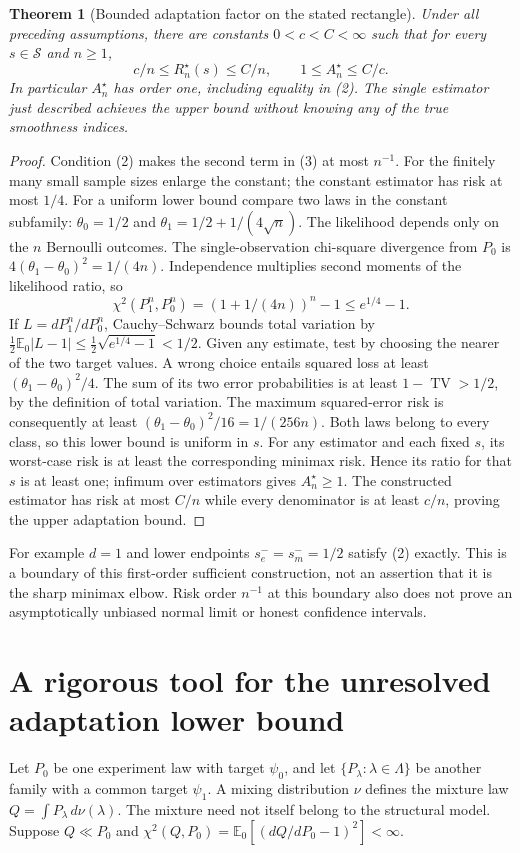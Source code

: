 \documentclass[11pt]{article}
\newtheorem{theorem}{Theorem}
\theoremstyle{remark}
\newcommand{\E}{\mathbb E}
\newcommand{\TV}{\operatorname{TV}}
\begin{document}
\begin{theorem}[Bounded adaptation factor on the stated rectangle]
Under all preceding assumptions, there are constants $0<c<C<\infty$
such that for every $s\in\mathcal S$ and $n\geq1$,
\[
 c/n\leq R_n^\star(s)\leq C/n,
 \qquad 1\leq A_n^\star\leq C/c.
\]
In particular $A_n^\star$ has order one, including equality in (2).
The single estimator just described achieves the upper bound without
knowing any of the true smoothness indices.
\end{theorem}
\begin{proof}
Condition (2) makes the second term in (3) at most $n^{-1}$.
For the finitely many small sample sizes enlarge the constant; the
constant estimator has risk at most $1/4$.
For a uniform lower bound compare two laws in the constant subfamily:
$\theta_0=1/2$ and $\theta_1=1/2+1/(4\sqrt n)$. The likelihood depends
only on the $n$ Bernoulli outcomes. The single-observation chi-square
divergence from $P_0$ is $4(\theta_1-\theta_0)^2=1/(4n)$.
Independence multiplies second moments of the likelihood ratio, so
\[
 \chi^2(P_1^n,P_0^n)=(1+1/(4n))^n-1\leq e^{1/4}-1.
\]
If $L=dP_1^n/dP_0^n$, Cauchy--Schwarz bounds total variation by
$\frac12\E_0|L-1|\leq\frac12\sqrt{e^{1/4}-1}<1/2$.
Given any estimate, test by choosing the nearer of the two target
values. A wrong choice entails squared loss at least
$(\theta_1-\theta_0)^2/4$. The sum of its two error probabilities is
at least $1-\TV>1/2$, by the definition of total variation.
The maximum squared-error risk is consequently at least
$(\theta_1-\theta_0)^2/16=1/(256n)$. Both laws belong to every class,
so this lower bound is uniform in $s$.
For any estimator and each fixed $s$, its worst-case risk is at least
the corresponding minimax risk. Hence its ratio for that $s$ is at
least one; infimum over estimators gives $A_n^\star\geq1$.
The constructed estimator has risk at most $C/n$ while every denominator
is at least $c/n$, proving the upper adaptation bound.
\end{proof}

For example $d=1$ and lower endpoints $s_e^-=s_m^-=1/2$ satisfy (2)
exactly. This is a boundary of this first-order sufficient construction,
not an assertion that it is the sharp minimax elbow. Risk order $n^{-1}$
at this boundary also does not prove an asymptotically unbiased normal
limit or honest confidence intervals.

\section{A rigorous tool for the unresolved adaptation lower bound}
Let $P_0$ be one experiment law with target $\psi_0$, and let
$\{P_\lambda:\lambda\in\Lambda\}$ be another family with a common
target $\psi_1$. A mixing distribution $\nu$ defines the mixture law
$Q=\int P_\lambda\,d\nu(\lambda)$. The mixture need not itself belong
to the structural model. Suppose $Q\ll P_0$ and
$\chi^2(Q,P_0)=\E_0[(dQ/dP_0-1)^2]<\infty$.
\end{document}
